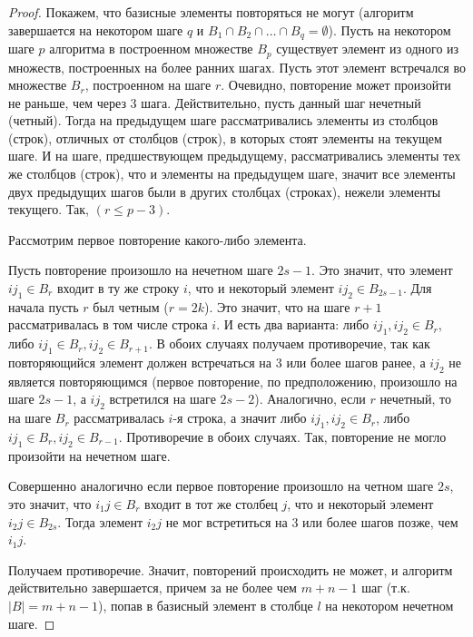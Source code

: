 \documentclass[12pt]{article}
\theoremstyle{definition}
\theoremstyle{plain}
\theoremstyle{definition}
\begin{document}
\begin{proof}
Покажем, что базисные элементы повторяться не могут (алгоритм завершается на
некотором шаге $q$ и $B_1 \cap B_2 \cap \dots \cap B_q = \emptyset$).
Пусть на некотором шаге $p$ алгоритма в построенном множестве $B_p$ существует
элемент из одного из множеств, построенных на более ранних шагах.
Пусть этот элемент встречался во множестве $B_r$, построенном на шаге $r$.
Очевидно, повторение может произойти не раньше, чем через 3 шага. Действительно,
пусть данный шаг нечетный (четный). Тогда на предыдущем шаге рассматривались элементы
из столбцов (строк), отличных от столбцов (строк), в которых стоят элементы на текущем шаге.
И на шаге, предшествующем предыдущему, рассматривались элементы тех же столбцов (строк), что
и элементы на предыдущем шаге, значит все элементы двух предыдущих шагов были в 
других столбцах (строках), нежели элементы текущего. Так, $(r \leq p - 3)$.

Рассмотрим первое повторение какого-либо элемента.

Пусть повторение произошло на нечетном шаге $2s-1$.
Это значит, что элемент
$ij_1 \in B_r$ входит в ту же строку $i$, что и некоторый элемент
$ij_2 \in B_{2s-1}$.
Для начала пусть $r$ был четным ($r = 2k$). Это значит, что на шаге $r+1$
рассматривалась в том числе строка $i$. И есть два варианта:
либо $ij_1, ij_2 \in B_r$, либо $ij_1 \in B_r, ij_2 \in B_{r+1}$. В обоих
случаях получаем противоречие, так как повторяющийся элемент
должен встречаться на 3 или более шагов ранее, а $ij_2$ не является повторяющимся
(первое повторение, по предположению, произошло на шаге $2s-1$, а $ij_2$ 
встретился на шаге $2s-2$). Аналогично, если $r$ нечетный, то на шаге $B_r$
рассматривалась $i$-я строка, а значит либо $ij_1, ij_2 \in B_r$, либо
$ij_1 \in B_r, ij_2 \in B_{r-1}$. Противоречие в обоих случаях. Так, повторение не
могло произойти на нечетном шаге.

Совершенно аналогично если первое повторение произошло на четном шаге $2s$, это значит,
что $i_1j \in B_r$ входит в тот же столбец $j$, что и некоторый элемент
$i_2j \in B_{2s}$. Тогда элемент $i_2j$ не мог встретиться на 3 или более шагов позже,
чем $i_1j$.

Получаем противоречие. Значит, повторений происходить не может, и алгоритм
действительно завершается, причем за не более чем $m + n - 1$ шаг
(т.к. $|B|=m+n-1$), попав в
базисный элемент в столбце $l$ на некотором нечетном шаге.


\end{proof}
\end{document}
